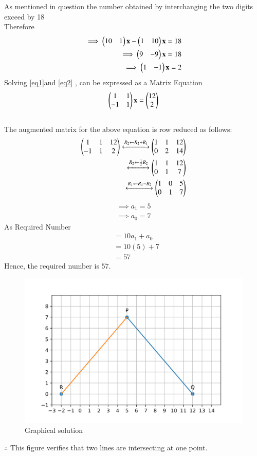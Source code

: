 \documentclass[journal,12pt,twocolumn]{IEEEtran}
\begin{document}
As mentioned in question the number obtained by interchanging the two digits exceed by 18\\
Therefore 
\begin{align}
  \implies\begin{pmatrix}10&1\end{pmatrix}\mathbf{x}-\begin{pmatrix}1&10\end{pmatrix}\mathbf{x}=18\\
   \implies\begin{pmatrix}9&-9\end{pmatrix}\mathbf{x}=18 \\ 
  \implies\begin{pmatrix}1&-1\end{pmatrix}\mathbf{x}=2\label{eq2}
\end{align}
 Solving  \eqref{eq1}and \eqref{eq2} , can be expressed as a Matrix Equation
 \begin{align}
    \begin{pmatrix}
    1 & 1 \\-1 & 1\end{pmatrix}\mathbf{x} = \begin{pmatrix}12\\2\end{pmatrix}
 \end{align}
 \\
The augmented matrix for the above equation
is row reduced as follows:
\begin{align}
\begin{pmatrix}1&1&12\\-1&1&2\end{pmatrix}\xleftrightarrow{R_2\leftarrow R_2+ R_1} \begin{pmatrix}1&1&12\\0&2&14\end{pmatrix}
\\
\xleftrightarrow{R_2\leftarrow \frac{1}{2}R_2} \begin{pmatrix}1&1&12 \\ 0&1&7\end{pmatrix}
\\
\xleftrightarrow{R_1 \leftarrow R_1-R_2}
\begin{pmatrix}1&0&5\\0&1&7\end{pmatrix}
\end{align}
 \begin{align}
 \implies {a_1}=5 \\
\implies {a_0}=7
 \end{align}  
 As Required Number 
    \begin{align}
        &=10 {a_1}+{a_0}\\
        &=10(5)+7\\
        &=57
    \end{align}
  Hence, the required number is $57$.
\begin{figure}[H]
    \includegraphics[width= \columnwidth]{Figure.png}
    \caption{Graphical solution}
    \label{Fig:Graphical Solution}
\end{figure}
$\therefore$ This figure verifies that two lines are intersecting at one point.
\end{document}
